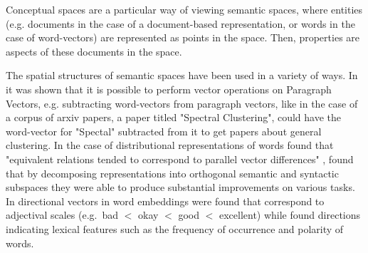 
Conceptual spaces are a particular way of viewing semantic spaces, where entities (e.g. documents in the case of a document-based representation, or words in the case of word-vectors) are represented as points in the space. Then, properties are aspects of these documents in the space. 

The spatial structures of semantic spaces have been used in a variety of ways. In \cite{Dai} it was shown that it is possible to perform vector operations on Paragraph Vectors,  e.g. subtracting word-vectors from paragraph vectors, like in the case of a corpus of arxiv papers, a paper titled "Spectral Clustering", could have the word-vector for "Spectal"  subtracted from it to get papers about general clustering. In the case of distributional representations of words \cite{TomasMikolovWen-tauYih2013} found that "equivalent relations tended to correspond to parallel vector differences" \cite{Mitchell2015}, found that by decomposing representations into orthogonal semantic and syntactic subspaces they were able to produce substantial improvements on various tasks. In \cite{kim2013deriving} directional vectors in word embeddings were found that correspond to adjectival scales (e.g.\ bad $<$ okay $<$ good $<$ excellent) while \cite{Rothe2016} found directions indicating lexical features such as the frequency of occurrence and polarity of words.

